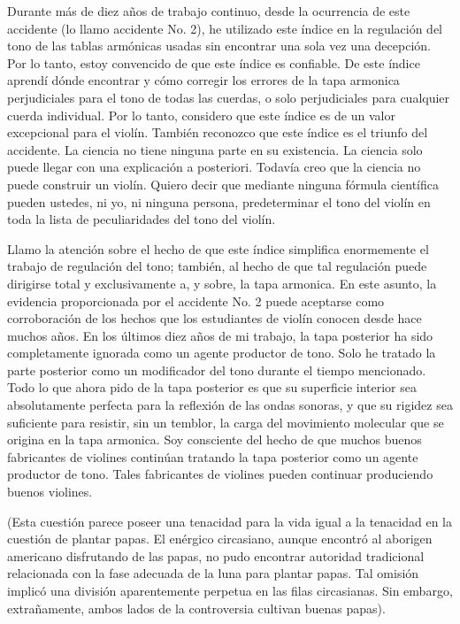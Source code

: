 \documentclass[12pt]{book}
\begin{document}
Durante más de diez años de trabajo continuo, desde la ocurrencia de este accidente (lo llamo accidente No. 2), he utilizado este índice en la regulación del tono de las tablas armónicas usadas sin encontrar una sola vez una decepción. Por lo tanto, estoy convencido de que este índice es confiable. De este índice aprendí dónde encontrar y cómo corregir los errores de la tapa armonica perjudiciales para el tono de todas las cuerdas, o solo perjudiciales para cualquier cuerda individual. Por lo tanto, considero que este índice es de un valor excepcional para el violín. También reconozco que este índice es el triunfo del accidente. La ciencia no tiene ninguna parte en su existencia. La ciencia solo puede llegar con una explicación a posteriori. Todavía creo que la ciencia no puede construir un violín. Quiero decir que mediante ninguna fórmula científica pueden ustedes, ni yo, ni ninguna persona, predeterminar el tono del violín en toda la lista de peculiaridades del tono del violín.

Llamo la atención sobre el hecho de que este índice simplifica enormemente el trabajo de regulación del tono; también, al hecho de que tal regulación puede dirigirse total y exclusivamente a, y sobre, la tapa armonica. En este asunto, la evidencia proporcionada por el accidente No. 2 puede aceptarse como corroboración de los hechos que los estudiantes de violín conocen desde hace muchos años. En los últimos diez años de mi trabajo, la tapa posterior ha sido completamente ignorada como un agente productor de tono. Solo he tratado la parte posterior como un modificador del tono durante el tiempo mencionado. Todo lo que ahora pido de la tapa posterior es que su superficie interior sea absolutamente perfecta para la reflexión de las ondas sonoras, y que su rigidez sea suficiente para resistir, sin un temblor, la carga del movimiento molecular que se origina en la tapa armonica. Soy consciente del hecho de que muchos buenos fabricantes de violines continúan tratando la tapa posterior como un agente productor de tono. Tales fabricantes de violines pueden continuar produciendo buenos violines.

(Esta cuestión parece poseer una tenacidad para la vida igual a la tenacidad en la cuestión de plantar papas. El enérgico circasiano, aunque encontró al aborigen americano disfrutando de las papas, no pudo encontrar autoridad tradicional relacionada con la fase adecuada de la luna para plantar papas. Tal omisión implicó una división aparentemente perpetua en las filas circasianas. Sin embargo, extrañamente, ambos lados de la controversia cultivan buenas papas).
\end{document}
